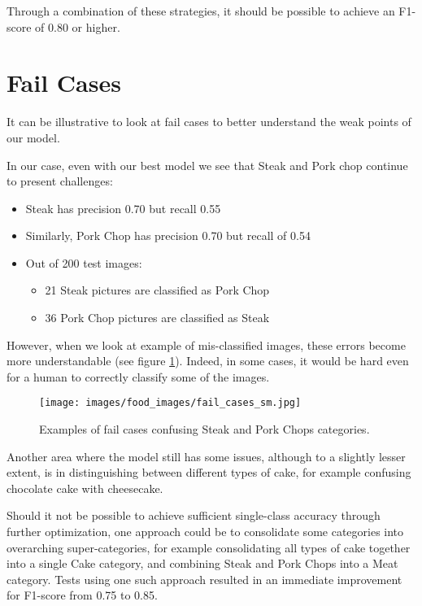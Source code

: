 \documentclass[10pt,a4paper]{article}
\begin{document}
Through a combination of these strategies, it should be possible to achieve an F1-score of 0.80 or higher.

\afterpage{\clearpage}

\section{Fail Cases}

It can be illustrative to look at fail cases to better understand the weak points of our model.

In our case, even with our best model we see that Steak and Pork chop continue to present challenges:

\begin{itemize}
\item Steak has precision 0.70 but recall 0.55
\item Similarly, Pork Chop has precision 0.70 but recall of 0.54
\item Out of 200 test images:
\begin{itemize}
\item 21 Steak pictures are classified as Pork Chop
\item 36 Pork Chop pictures are classified as Steak
\end{itemize}
\end{itemize}

However, when we look at example of mis-classified images, these errors become more understandable (see figure \ref{fig:fail-cases}). Indeed, in some cases, it would be hard even for a human to correctly classify some of the images.

\begin{figure}[h!]
\begin{framed}
  \caption{Examples of fail cases confusing Steak and Pork Chops categories.}
  \texttt{[image: images/food\_images/fail\_cases\_sm.jpg]}
  \label{fig:fail-cases}
\end{framed}
\end{figure}

Another area where the model still has some issues, although to a slightly lesser extent, is in distinguishing between different types of cake, for example confusing chocolate cake with cheesecake.

Should it not be possible to achieve sufficient single-class accuracy through further optimization, one approach could be to consolidate some categories into overarching super-categories, for example consolidating all types of cake together into a single Cake category, and combining Steak and Pork Chops into a Meat category. Tests using one such approach resulted in an immediate improvement for F1-score from 0.75 to 0.85.
\end{document}
